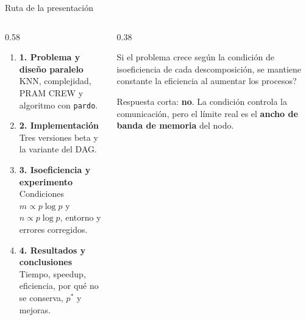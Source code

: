 \documentclass[10pt, aspectratio=169]{beamer}
\newcommand{\cajaAcento}[2]{%
  {\setlength{\fboxsep}{6pt}%
   \colorbox{UTECCyan!10}{\begin{minipage}{\dimexpr#1-2\fboxsep\relax}#2\end{minipage}}}%
}
\newcommand{\encCaja}[1]{\textbf{\color{UTECDarkBlue}{#1}}\par\vspace{0.08cm}}
\begin{document}
\begin{frame}{Ruta de la presentación}
    \vspace{0.2cm}
    \begin{columns}[T,onlytextwidth]
        \begin{column}{0.58\textwidth}
            \begin{enumerate}
                \setlength{\itemsep}{0.85em}
                \item[] \textcolor{UTECDarkBlue}{\normalsize\bfseries 1. Problema y diseño paralelo} \\
                {\footnotesize\color{UTECGray}KNN, complejidad, PRAM CREW y algoritmo con \texttt{pardo}.}

                \item[] \textcolor{UTECDarkBlue}{\normalsize\bfseries 2. Implementación} \\
                {\footnotesize\color{UTECGray}Tres versiones beta y la variante del DAG.}

                \item[] \textcolor{UTECDarkBlue}{\normalsize\bfseries 3. Isoeficiencia y experimento} \\
                {\footnotesize\color{UTECGray}Condiciones $m\propto p\log p$ y $n\propto p\log p$, entorno y errores corregidos.}

                \item[] \textcolor{UTECDarkBlue}{\normalsize\bfseries 4. Resultados y conclusiones} \\
                {\footnotesize\color{UTECGray}Tiempo, speedup, eficiencia, por qué no se conserva, $p^*$ y mejoras.}
            \end{enumerate}
        \end{column}

        \begin{column}{0.38\textwidth}
            \vspace{0.1cm}
            \cajaAcento{\linewidth}{%
                \encCaja{Pregunta central}
                \footnotesize
                Si el problema crece según la condición de isoeficiencia de cada descomposición,
                \textquestiondown{}se mantiene constante la eficiencia al aumentar los procesos?

                \vspace{0.15cm}
                {\color{UTECGray}Respuesta corta: \textbf{no}. La condición controla la comunicación,
                pero el límite real es el \textbf{ancho de banda de memoria} del nodo.}
            }
        \end{column}
    \end{columns}
\end{frame}
\end{document}
